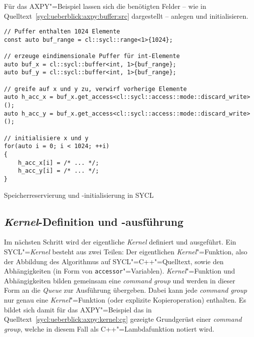 Für das AXPY"=Beispiel lassen sich die benötigten Felder -- wie in
Quelltext~\ref{sycl:ueberblick:axpy:buffer:src} dargestellt -- anlegen und
initialisieren.
%
\begin{code}
    \begin{verbatim}
// Puffer enthalten 1024 Elemente
const auto buf_range = cl::sycl::range<1>{1024};

// erzeuge eindimensionale Puffer für int-Elemente
auto buf_x = cl::sycl::buffer<int, 1>{buf_range};
auto buf_y = cl::sycl::buffer<int, 1>{buf_range};

// greife auf x und y zu, verwirf vorherige Elemente
auto h_acc_x = buf_x.get_access<cl::sycl::access::mode::discard_write>();
auto h_acc_y = buf_x.get_access<cl::sycl::access::mode::discard_write>();

// initialisiere x und y
for(auto i = 0; i < 1024; ++i)
{
    h_acc_x[i] = /* ... */;
    h_acc_y[i] = /* ... */;
}
    \end{verbatim}
    \caption{Speicherreservierung und -initialisierung in SYCL}
    \label{sycl:ueberblick:axpy:buffer:src}
\end{code}

\subsection{\textit{Kernel}-Definition und -ausführung}
\label{sycl:ueberblick:axpy:kernel}

Im nächsten Schritt wird der eigentliche \textit{Kernel} definiert und
ausgeführt. Ein SYCL"=\textit{Kernel} besteht aus zwei Teilen: Der eigentlichen
\textit{Kernel}"=Funktion, also der Abbildung des Algorithmus auf
SYCL"=C++"=Quelltext, sowie den Abhängigkeiten (in Form von
\texttt{accessor}"=Variablen). \textit{Kernel}"=Funktion und Abhängigkeiten
bilden gemeinsam eine \textit{command group} und werden in dieser Form an die
\textit{Queue} zur Ausführung übergeben. Dabei kann jede \textit{command group}
nur genau eine \textit{Kernel}"=Funktion (oder explizite Kopieroperation)
enthalten. Es bildet sich damit für das AXPY"=Beispiel das in
Quelltext~\ref{sycl:ueberblick:axpy:kernel:cg} gezeigte Grundgerüst einer
\textit{command group}, welche in diesem Fall als C++"=Lambdafunktion notiert
wird.

